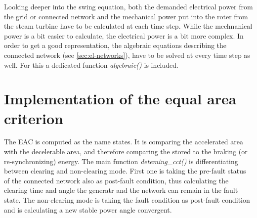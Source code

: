 Looking deeper into the swing equation, both the demanded electrical power from the grid or connected network and the mechanical power put into the roter from the steam turbine have to be calculated at each time step. While the mechnanical power is a bit easier to calculate, 
the electrical power is a bit more complex. In order to get a good representation, the algebraic equations describing the connected network (see \autoref{sec:el-networks}), have to be solved at every time step as well. For this a dedicated function {\itshape algebraic()} is included.

% 

\section{Implementation of the equal area criterion}
\label{sec:eac}


The \acf{EAC} is computed as the name states. It is comparing the accelerated area with the decelerable area, and therefore comparing the stored to the braking (or re-synchronizing) energy. The main function {\itshape deteming\_cct()} is differentiating between clearing and non-clearing mode. First one is taking the pre-fault status of the connected network also as post-fault condition, thus calculating the clearing time and angle the generatr and the network can remain in the fault state. The non-clearing mode is taking the fault condition as post-fault condition and is calculating a new stable power angle convergent.

% 

